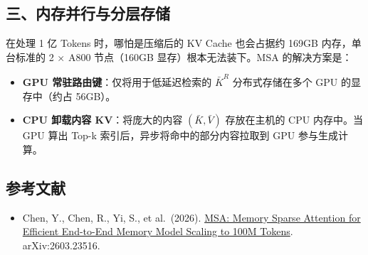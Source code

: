 \hypertarget{ux4e09ux5185ux5b58ux5e76ux884cux4e0eux5206ux5c42ux5b58ux50a8}{%
\subsection{三、内存并行与分层存储}\label{ux4e09ux5185ux5b58ux5e76ux884cux4e0eux5206ux5c42ux5b58ux50a8}}

在处理 1 亿 Tokens 时，哪怕是压缩后的 KV Cache 也会占据约 169GB 内存，单台标准的 2 × A800 节点（160GB 显存）根本无法装下。MSA 的解决方案是：

\begin{itemize}
\tightlist
\item
  \textbf{GPU 常驻路由键}：仅将用于低延迟检索的 \(\bar{K}^R\) 分布式存储在多个 GPU 的显存中（约占 56GB）。
\item
  \textbf{CPU 卸载内容 KV}：将庞大的内容 \((\bar{K},\bar{V})\) 存放在主机的 CPU 内存中。当 GPU 算出 Top-k 索引后，异步将命中的部分内容拉取到 GPU 参与生成计算。
\end{itemize}

\hypertarget{ux53c2ux8003ux6587ux732e-142}{%
\subsection{参考文献}\label{ux53c2ux8003ux6587ux732e-142}}

\begin{itemize}
\tightlist
\item
  Chen, Y., Chen, R., Yi, S., et al.~(2026). \href{https://arxiv.org/abs/2603.23516}{MSA: Memory Sparse Attention for Efficient End-to-End Memory Model Scaling to 100M Tokens}. arXiv:2603.23516.
\end{itemize}

\clearpage
